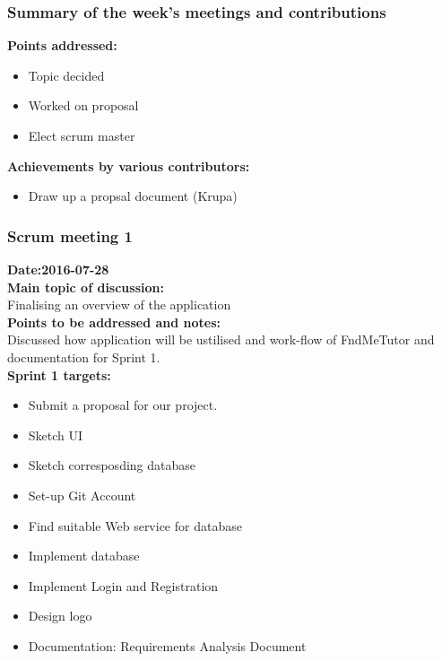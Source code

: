 \documentclass[12pt]{article}
\begin{document}
{\subsubsection{Summary of the week's meetings and contributions}
\textbf{Points addressed:}
\begin{itemize}
\item Topic decided
\item Worked on proposal
\item Elect scrum master
\end{itemize}
\textbf{Achievements by various contributors:}
\begin{itemize}
\item Draw up a propsal document (Krupa)
\end{itemize}

\subsubsection{Scrum meeting 1}
\textbf{Date:2016-07-28}\\
\textbf{Main topic of discussion:}\\
Finalising an overview of the application\\
\textbf{Points to be addressed and notes:}\\
Discussed how application will be ustilised and work-flow of FndMeTutor and documentation for Sprint 1.\\
\textbf{Sprint 1 targets:} \\
\begin{itemize}
\item Submit a proposal for our project.
\item Sketch UI
\item Sketch corresposding database
\item Set-up Git Account
\item Find suitable Web service for database
\item Implement database
\item Implement Login and Registration
\item Design logo
\item Documentation: Requirements Analysis Document
\end{itemize}

}
\end{document}
